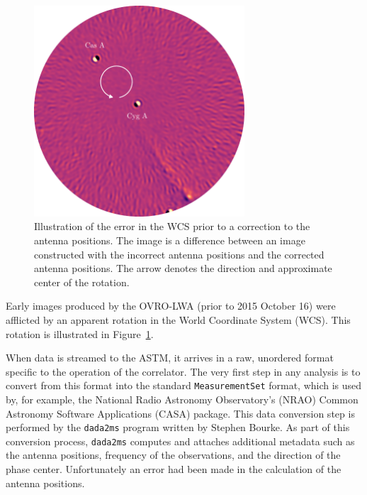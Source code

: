 \begin{bibunit}
\begin{figure}
    \centering
    \includegraphics[width=0.7\textwidth]{figures/chapter2/northing-easting-mistake/northing-easting-mistake}
    \caption{
        Illustration of the error in the WCS prior to a correction to the antenna positions. The
        image is a difference between an image constructed with the incorrect antenna positions and
        the corrected antenna positions. The arrow denotes the direction and approximate center of
        the rotation.
    }
    \label{fig:northing-easting-mistake}
\end{figure}

Early images produced by the OVRO-LWA (prior to 2015 October 16) were afflicted by an apparent
rotation in the World Coordinate System (WCS). This rotation is illustrated in
Figure~\ref{fig:northing-easting-mistake}.

When data is streamed to the ASTM, it arrives in a raw, unordered format specific to the operation
of the correlator. The very first step in any analysis is to convert from this format into the
standard \texttt{MeasurementSet} format, which is used by, for example, the National Radio Astronomy
Observatory's (NRAO) Common Astronomy Software Applications (CASA) package. This data conversion
step is performed by the \texttt{dada2ms} program written by Stephen Bourke. As part of this
conversion process, \texttt{dada2ms} computes and attaches additional metadata such as the antenna
positions, frequency of the observations, and the direction of the phase center. Unfortunately an
error had been made in the calculation of the antenna positions.


\end{bibunit}
